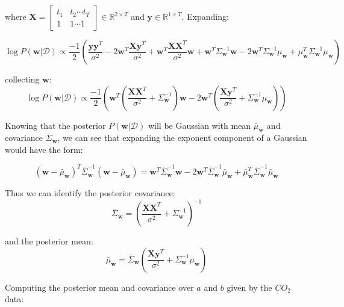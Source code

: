 \documentclass[12pt]{article}
\begin{document}
where $\textbf{X} =  \begin{bmatrix}
                 t_1 & t_2 \cdots t_T \\
                 1 & 1 \cdots 1
         \end{bmatrix} \in  \mathbb{R}^{2 \times T}$ and $\textbf{y} \in \mathbb{R}^{1 \times T}$.
Expanding:

\[\log P(\textbf{w} | \mathcal{D}) \propto
  \frac{-1}{2} \left( \frac{\textbf{y} \textbf{y}^T}{\sigma^2} - 2\textbf{w}^T \frac{\textbf{X}\textbf{y}^T}{\sigma^2} + \textbf{w}^T \frac{\textbf{X} \textbf{X}^T}{\sigma^2} \textbf{w} +  \textbf{w}^T \Sigma_{\textbf{w}}^{-1}  \textbf{w} - 2\textbf{w}^T \Sigma_{\textbf{w}}^{-1}\mu_{\textbf{w}} + \mu_{\textbf{w}}^T\Sigma_{\textbf{w}}^{-1}\mu_{\textbf{w}} \right)
\]

collecting $\textbf{w}$:
\[\log P(\textbf{w} | \mathcal{D}) \propto
  \frac{-1}{2} \left( \textbf{w}^T \left(\frac{\textbf{X} \textbf{X}^T}{\sigma^2} + \Sigma_{\textbf{w}}^{-1} \right)  \textbf{w} - 2\textbf{w}^T \left(\frac{\textbf{X}\textbf{y}^T}{\sigma^2} + \Sigma_{\textbf{w}}^{-1} \mu_{\textbf{w}}\right)  \right)
\]

Knowing that the posterior $P(\textbf{w} | \mathcal{D})$ will be Gaussian with mean $\bar{\mu}_{\textbf{w}}$ and covariance $\bar{\Sigma}_{\textbf{w}}$, we can see that expanding the exponent component of a Gaussian would have the form:

\[\left( \textbf{w} - \bar{\mu}_{\textbf{w}} \right)^T \bar{\Sigma}_{\textbf{w}}^{-1} \left( \textbf{w} - \bar{\mu}_{\textbf{w}} \right) = \textbf{w}^T \bar{\Sigma}_{\textbf{w}}^{-1} \textbf{w} -2 \textbf{w}^T \bar{\Sigma}_{\textbf{w}}^{-1} \bar{\mu}_{\textbf{w}} + \bar{\mu}_{\textbf{w}}^T \bar{\Sigma}_{\textbf{w}}^{-1} \bar{\mu}_{\textbf{w}}\]

Thus we can identify the posterior covariance:
\[\bar{\Sigma}_{\textbf{w}} = \left(\frac{\textbf{X} \textbf{X}^T}{\sigma^2} + \Sigma_{\textbf{w}}^{-1} \right)^{-1}\]

and the posterior mean:
\[\bar{\mu}_{\textbf{w}} = \bar{\Sigma}_{\textbf{w}} \left(\frac{\textbf{X}\textbf{y}^T}{\sigma^2} + \Sigma_{\textbf{w}}^{-1} \mu_{\textbf{w}}\right) \]


\newpage
Computing the posterior mean and covariance over $a$ and $b$ given by the $CO_2$ data:
\end{document}
